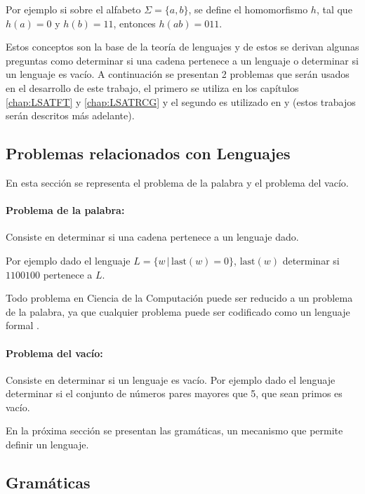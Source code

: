 Por ejemplo si sobre el alfabeto $\Sigma=\{a,b\}$, se define el homomorfismo $h$, tal que $h(a)=0$ y $h(b)=11$, entonces
$h(ab)=011$.

Estos conceptos son la base de la teoría de lenguajes y de estos 
se derivan algunas preguntas como determinar si una cadena pertenece a un lenguaje o determinar si un lenguaje es 
vacío. A continuación se presentan 2 problemas que serán usados en el desarrollo de este trabajo, 
el primero se utiliza en los capítulos \ref{chap:LSATFT} y \ref{chap:LSATRCG} y el segundo es utilizado
en \cite{aCFSAT} y \cite{aSRCSAT} (estos trabajos serán descritos más adelante).

\subsection{Problemas relacionados con Lenguajes}

En esta sección se representa el problema de la palabra y el problema del vacío.

\paragraph{Problema de la palabra:} Consiste en determinar si una cadena pertenece a un lenguaje dado.

Por ejemplo dado el lenguaje $L=\{w\,|\,\text{last}(w)=0\}$, $\text{last}(w)$ determinar si $1100100$ pertenece a $L$.

Todo problema en Ciencia de la Computación puede ser reducido a un problema de la palabra, ya que cualquier problema puede ser codificado como un lenguaje formal \cite{authomataTheory}.

\paragraph{Problema del vacío:} Consiste en determinar si un lenguaje es vacío. 
Por ejemplo dado el lenguaje determinar si el conjunto de números pares mayores que 5, que sean primos es vacío.

En la próxima sección se presentan las gramáticas, un mecanismo que permite definir un lenguaje.

\subsection{Gramáticas}

